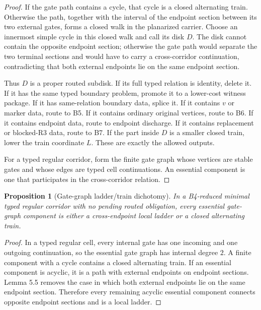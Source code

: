 \documentclass[11pt]{amsart}
\newtheorem{proposition}[theorem]{Proposition}
\theoremstyle{definition}
\begin{document}
\begin{proof}
If the gate path contains a cycle, that cycle is a closed alternating train. Otherwise the path, together with the interval of the endpoint section between its two external gates, forms a closed walk in the planarized carrier. Choose an innermost simple cycle in this closed walk and call its disk \(D\). The disk cannot contain the opposite endpoint section; otherwise the gate path would separate the two terminal sections and would have to carry a cross-corridor continuation, contradicting that both external endpoints lie on the same endpoint section.

Thus \(D\) is a proper routed subdisk. If its full typed relation is identity, delete it. If it has the same typed boundary problem, promote it to a lower-cost witness package. If it has same-relation boundary data, splice it. If it contains \(v\) or marker data, route to B5. If it contains ordinary original vertices, route to B6. If it contains endpoint data, route to endpoint discharge. If it contains replacement or blocked-R3 data, route to B7. If the part inside \(D\) is a smaller closed train, lower the train coordinate \(L\). These are exactly the allowed outputs.

For a typed regular corridor, form the finite gate graph whose vertices are stable gates and whose edges are typed cell continuations. An essential component is one that participates in the cross-corridor relation.

\end{proof}
\begin{proposition}[Gate-graph ladder/train dichotomy]
In a B4-reduced minimal typed regular corridor with no pending routed obligation, every essential gate-graph component is either a cross-endpoint local ladder or a closed alternating train.

\end{proposition}
\begin{proof}
In a typed regular cell, every internal gate has one incoming and one outgoing continuation, so the essential gate graph has internal degree \(2\). A finite component with a cycle contains a closed alternating train. If an essential component is acyclic, it is a path with external endpoints on endpoint sections. Lemma 5.5 removes the case in which both external endpoints lie on the same endpoint section. Therefore every remaining acyclic essential component connects opposite endpoint sections and is a local ladder.

\end{proof}
\end{document}
